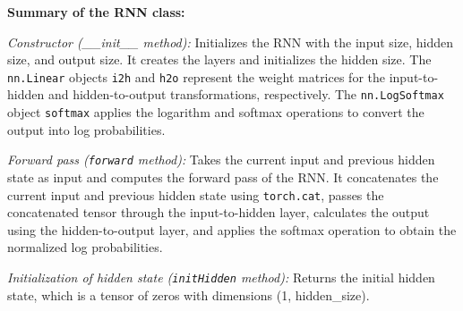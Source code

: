 \textbf{Summary of the RNN class:}

\textit{Constructor (\_\_init\_\_ method):} Initializes the RNN with the input size, hidden size, and output size. It creates the layers and initializes the hidden size. The \texttt{nn.Linear} objects \texttt{i2h} and \texttt{h2o} represent the weight matrices for the input-to-hidden and hidden-to-output transformations, respectively. The \texttt{nn.LogSoftmax} object \texttt{softmax} applies the logarithm and softmax operations to convert the output into log probabilities.

\textit{Forward pass (\texttt{forward} method):} Takes the current input and previous hidden state as input and computes the forward pass of the RNN. It concatenates the current input and previous hidden state using \texttt{torch.cat}, passes the concatenated tensor through the input-to-hidden layer, calculates the output using the hidden-to-output layer, and applies the softmax operation to obtain the normalized log probabilities.

\textit{Initialization of hidden state (\texttt{initHidden} method):} Returns the initial hidden state, which is a tensor of zeros with dimensions (1, hidden\_size).

